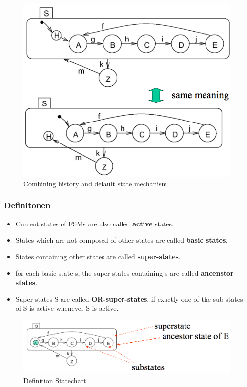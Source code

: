 \begin{figure}[htbp]
  \centering
  {\includegraphics[scale = 0.3]{images/FSM/history_default_state_mechanism}  
  \caption{Combining history and default state mechanism}
  \label{fig:history_default_state_mechanism}}
\end{figure} 

\subsubsection{Definitonen}
\begin{itemize}
  \item Current states of FSMs are also called \textbf{active} states.
  \item States which are not composed of other states are called \textbf{basic
  states}.
  \item States containing other states are called \textbf{super-states}.
  \item for each basic state s, the super-states containing s are called
  \textbf{ancenstor states}.
  \item Super-states S are called \textbf{OR-super-states}, if exactly one of
  the sub-states of S is active whenever S is active.
\end{itemize}

\begin{figure}[htbp]
  \centering
  {\includegraphics[scale = 0.3]{images/FSM/definition_statechart}  
  \caption{Definition Statechart}
  \label{fig:definition_statechart}}
\end{figure} 


